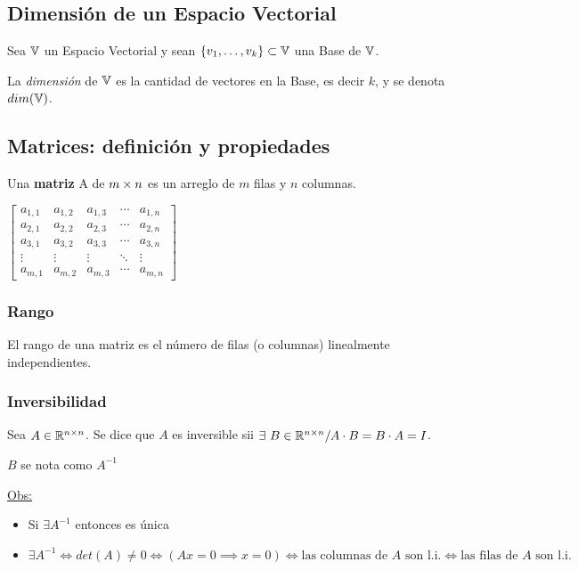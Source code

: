 \subsection{Dimensión de un Espacio Vectorial}
Sea $\mathbb{V}$ un Espacio Vectorial y sean $\{v_1, \dots, v_k\} \subset \mathbb{V}$ una Base de $\mathbb{V}$.
\begin{defi}
	La \textit{dimensión} de $\mathbb{V}$ es la cantidad de vectores en la Base, es decir $k$,
	y se denota $dim(\mathbb{V})$.
\end{defi}

\subsection{Matrices: definición y propiedades}
\begin{defi}
	Una \textbf{matriz} A de $m \times n$ es un arreglo de $m$ filas y $n$ columnas. \\
	\begin{center}
		$\begin{bmatrix}
			a_{1,1} & a_{1,2} & a_{1,3} & \cdots & a_{1,n} \\
			a_{2,1} & a_{2,2} & a_{2,3} & \cdots & a_{2,n} \\
			a_{3,1} & a_{3,2} & a_{3,3} & \cdots & a_{3,n} \\
			\vdots & \vdots & \vdots & \ddots & \vdots \\
			a_{m,1} & a_{m,2} & a_{m,3} & \cdots & a_{m,n}
		\end{bmatrix}$
	\end{center}
\end{defi}

\subsubsection{Rango}
El rango de una matriz es el número de filas (o columnas) linealmente independientes.

\subsubsection{Inversibilidad}
Sea $A \in\mathbb{R}^{n\times n}$. Se dice que $A$ es inversible sii $\exists\ B\in\mathbb{R}^{n\times n} / A\cdot B = B\cdot A = I$.

$B$ se nota como $A^{-1}$

\underline{Obs:}
\begin{itemize}
	\item Si $\exists A^{-1}$ entonces es única
	\item $\exists A^{-1} \iff det(A)\neq 0 \iff (Ax = 0 \implies x=0) \iff
		\text{las columnas de } A \text{ son l.i.} \iff \text{las filas de } A
		\text{ son l.i.}$
\end{itemize}

